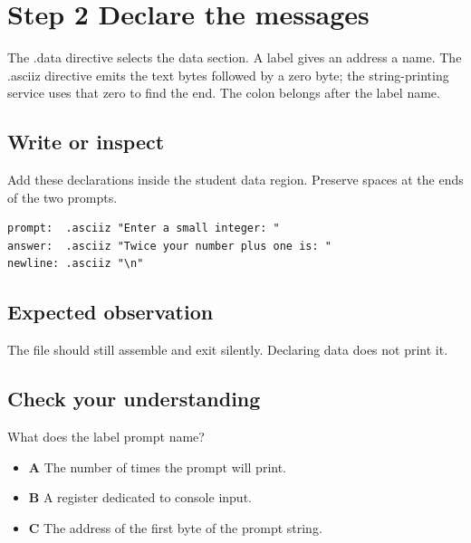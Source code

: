 \section{Step 2 Declare the
  messages}\label{001-console-calculation-s02-step-2-declare-the-messages}

The .data directive selects the data section. A label gives an address a
name. The .asciiz directive emits the text bytes followed by a zero
byte; the string-printing service uses that zero to find the end. The
colon belongs after the label name.

\subsection{Write or
  inspect}\label{001-console-calculation-s02-write-or-inspect}

Add these declarations inside the student data region. Preserve spaces
at the ends of the two prompts.

\begin{verbatim}
prompt:  .asciiz "Enter a small integer: "
answer:  .asciiz "Twice your number plus one is: "
newline: .asciiz "\n"
\end{verbatim}

\subsection{Expected
  observation}\label{001-console-calculation-s02-expected-observation}

The file should still assemble and exit silently. Declaring data does
not print it.

\subsection{Check your
  understanding}\label{001-console-calculation-s02-check-your-understanding}

What does the label prompt name?

\begin{itemize}
  \tightlist
  \item
        \textbf{A} The number of times the prompt will print.
  \item
        \textbf{B} A register dedicated to console input.
  \item
        \textbf{C} The address of the first byte of the prompt string.
\end{itemize}
